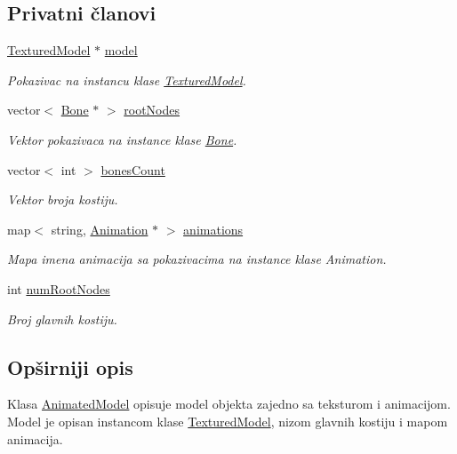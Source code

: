 \subsection*{Privatni članovi}
\begin{DoxyCompactItemize}
\item 
\hyperlink{classmodel_1_1TexturedModel}{Textured\+Model} $\ast$ \hyperlink{classmodel_1_1AnimatedModel_a9856ce11025686cdf78bf5729556613c}{model}
\begin{DoxyCompactList}\small\item\em Pokazivac na instancu klase \hyperlink{classmodel_1_1TexturedModel}{Textured\+Model}. \end{DoxyCompactList}\item 
vector$<$ \hyperlink{classmodel_1_1Bone}{Bone} $\ast$ $>$ \hyperlink{classmodel_1_1AnimatedModel_a26c1309582cde31ac4dfb8e2436a0cd7}{root\+Nodes}
\begin{DoxyCompactList}\small\item\em Vektor pokazivaca na instance klase \hyperlink{classmodel_1_1Bone}{Bone}. \end{DoxyCompactList}\item 
vector$<$ int $>$ \hyperlink{classmodel_1_1AnimatedModel_aea55cadf949b3bd7bd5eb66d1d6ad304}{bones\+Count}
\begin{DoxyCompactList}\small\item\em Vektor broja kostiju. \end{DoxyCompactList}\item 
map$<$ string, \hyperlink{classanimation_1_1Animation}{Animation} $\ast$ $>$ \hyperlink{classmodel_1_1AnimatedModel_ae366eb62ff617640a6b7a4aee86ff273}{animations}
\begin{DoxyCompactList}\small\item\em Mapa imena animacija sa pokazivacima na instance klase Animation. \end{DoxyCompactList}\item 
int \hyperlink{classmodel_1_1AnimatedModel_a0115b34f0a5c6f60e06c446ee3d7e442}{num\+Root\+Nodes}
\begin{DoxyCompactList}\small\item\em Broj glavnih kostiju. \end{DoxyCompactList}\end{DoxyCompactItemize}


\subsection{Opširniji opis}
Klasa \hyperlink{classmodel_1_1AnimatedModel}{Animated\+Model} opisuje model objekta zajedno sa teksturom i animacijom. Model je opisan instancom klase \hyperlink{classmodel_1_1TexturedModel}{Textured\+Model}, nizom glavnih kostiju i mapom animacija. 

